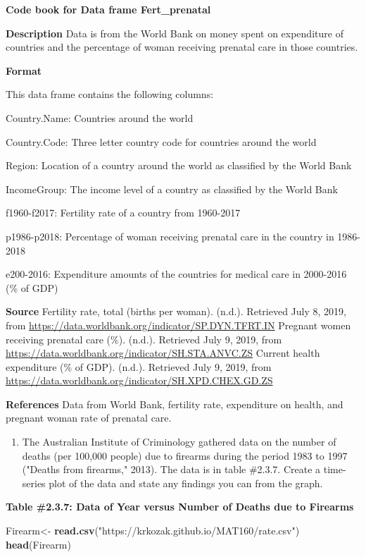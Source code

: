 \documentclass[
]{book}
\newenvironment{Shaded}{\begin{snugshade}}{\end{snugshade}}
\newcommand{\KeywordTok}[1]{\textcolor[rgb]{0.13,0.29,0.53}{\textbf{#1}}}
\newcommand{\NormalTok}[1]{#1}
\newcommand{\StringTok}[1]{\textcolor[rgb]{0.31,0.60,0.02}{#1}}
\providecommand{\tightlist}{%
  \setlength{\itemsep}{0pt}\setlength{\parskip}{0pt}}
\begin{document}
\textbf{Code book for Data frame Fert\_prenatal}

\textbf{Description}
Data is from the World Bank on money spent on expenditure of countries and the percentage of woman receiving prenatal care in those countries.

\textbf{Format}

This data frame contains the following columns:

Country.Name: Countries around the world

Country.Code: Three letter country code for countries around the world

Region: Location of a country around the world as classified by the World Bank

IncomeGroup: The income level of a country as classified by the World Bank

f1960-f2017: Fertility rate of a country from 1960-2017

p1986-p2018: Percentage of woman receiving prenatal care in the country in 1986-2018

e200-2016: Expenditure amounts of the countries for medical care in 2000-2016 (\% of GDP)

\textbf{Source}
Fertility rate, total (births per woman). (n.d.). Retrieved July 8, 2019, from \url{https://data.worldbank.org/indicator/SP.DYN.TFRT.IN}
Pregnant women receiving prenatal care (\%). (n.d.). Retrieved July 9, 2019, from \url{https://data.worldbank.org/indicator/SH.STA.ANVC.ZS}
Current health expenditure (\% of GDP). (n.d.). Retrieved July 9, 2019, from \url{https://data.worldbank.org/indicator/SH.XPD.CHEX.GD.ZS}

\textbf{References}
Data from World Bank, fertility rate, expenditure on health, and pregnant woman rate of prenatal care.

\begin{enumerate}
\def\labelenumi{\arabic{enumi}.}
\setcounter{enumi}{4}
\tightlist
\item
  The Australian Institute of Criminology gathered data on the number of deaths (per 100,000 people) due to firearms during the period 1983 to 1997 ("Deaths from firearms," 2013). The data is in table \#2.3.7. Create a time-series plot of the data and state any findings you can from the graph.
\end{enumerate}

\textbf{Table \#2.3.7: Data of Year versus Number of Deaths due to Firearms}

\begin{Shaded}
\begin{Highlighting}[]
\NormalTok{Firearm<-}\StringTok{ }\KeywordTok{read.csv}\NormalTok{(}\StringTok{"https://krkozak.github.io/MAT160/rate.csv"}\NormalTok{)}
\KeywordTok{head}\NormalTok{(Firearm)}
\end{Highlighting}
\end{Shaded}
\end{document}
